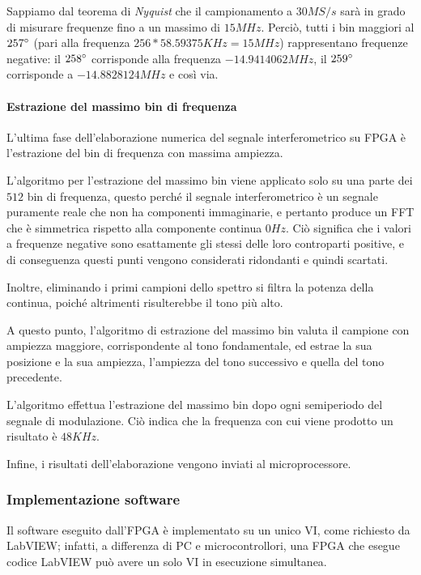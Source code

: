 Sappiamo dal teorema di \textit{Nyquist} che il campionamento a $30MS/s$ sarà in grado di misurare frequenze fino a un massimo di $15MHz$. Perciò, tutti i bin maggiori al $257\degree$ (pari alla frequenza $256 * 58.59375 KHz = 15MHz$) rappresentano frequenze negative: il $258\degree$ corrisponde alla frequenza $-14.9414062 MHz$, il $259\degree$ corrisponde a $-14.8828124 MHz$ e così via.

\paragraph{Estrazione del massimo bin di frequenza}
L'ultima fase dell'elaborazione numerica del segnale interferometrico su FPGA è l'estrazione del bin di frequenza con massima ampiezza.

L'algoritmo per l'estrazione del massimo bin viene applicato solo su una parte dei $512$ bin di frequenza, questo perché il segnale interferometrico è un segnale puramente reale che non ha componenti immaginarie, e pertanto produce un FFT che è simmetrica rispetto alla componente continua $0 Hz$. Ciò significa che i valori a frequenze negative sono esattamente gli stessi delle loro controparti positive, e di conseguenza questi punti vengono considerati ridondanti e quindi scartati.

Inoltre, eliminando i primi campioni dello spettro si filtra la potenza della continua, poiché altrimenti risulterebbe il tono più alto. 

A questo punto, l'algoritmo di estrazione del massimo bin valuta il campione con ampiezza maggiore, corrispondente al tono fondamentale, ed estrae la sua posizione e la sua ampiezza, l'ampiezza del tono successivo e quella del tono precedente.

L'algoritmo effettua l'estrazione del massimo bin dopo ogni semiperiodo del segnale di modulazione. Ciò indica che la frequenza con cui viene prodotto un risultato è $48KHz$.

Infine, i risultati dell'elaborazione vengono inviati al microprocessore.

\subsubsection{Implementazione software}
Il software eseguito dall'FPGA è implementato su un unico VI, come richiesto da LabVIEW; infatti, a differenza di PC e microcontrollori, una FPGA che esegue codice LabVIEW può avere un solo VI in esecuzione simultanea.

